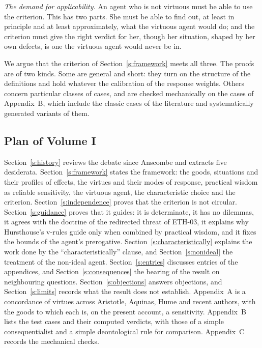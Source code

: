 \documentclass{situationist-preprint}
\begin{document}
\emph{The demand for applicability.} An agent who is not virtuous must be able to use the criterion. This has two parts. She must be able to find out, at least in principle and at least approximately, what the virtuous agent would do; and the criterion must give the right verdict for her, though her situation, shaped by her own defects, is one the virtuous agent would never be in.

We argue that the criterion of Section~\ref{s:framework} meets all three. The proofs are of two kinds. Some are general and short: they turn on the structure of the definitions and hold whatever the calibration of the response weights. Others concern particular classes of cases, and are checked mechanically on the \stncases{} cases of Appendix~B, which include the classic cases of the literature and systematically generated variants of them.

\subsection{Plan of Volume I}

Section~\ref{s:history} reviews the debate since Anscombe and extracts five desiderata. Section~\ref{s:framework} states the framework: the goods, situations and their profiles of effects, the virtues and their modes of response, practical wisdom as reliable sensitivity, the virtuous agent, the characteristic choice and the criterion. Section~\ref{s:independence} proves that the criterion is not circular. Section~\ref{s:guidance} proves that it guides: it is determinate, it has no dilemmas, it agrees with the doctrine of the redirected threat of ETH-03, it explains why Hursthouse's v-rules guide only when combined by practical wisdom, and it fixes the bounds of the agent's prerogative. Section~\ref{s:characteristically} explains the work done by the \enquote{characteristically} clause, and Section~\ref{s:nonideal} the treatment of the non-ideal agent. Section~\ref{s:entries} discusses entries of the appendices, and Section~\ref{s:consequences} the bearing of the result on neighbouring questions. Section~\ref{s:objections} answers objections, and Section~\ref{s:limits} records what the result does not establish. Appendix~A is a concordance of virtues across Aristotle, Aquinas, Hume and recent authors, with the goods to which each is, on the present account, a sensitivity. Appendix~B lists the test cases and their computed verdicts, with those of a simple consequentialist and a simple deontological rule for comparison. Appendix~C records the mechanical checks.
\end{document}
